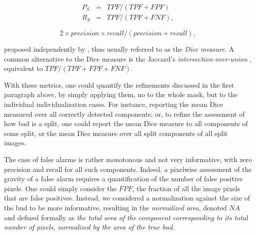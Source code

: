 \documentclass[a4paper,authoryear,review]{elsarticle}
\begin{document}
\begin{eqnarray*} 
	P_S &=& TPF / (TPF + FPF) \\
	R_S &=& TPF / (TPF + FNF),
\end{eqnarray*}

\begin{equation} 
2 \times precision \times recall / (precision + recall),
\end{equation}

proposed independently by \citet{dice1945measures}, thus usually referred to as the \emph{Dice measure}. A common alternative to the Dice measure is the  Jaccard’s \emph{intersection-over-union} \citep{jaccard1912distribution}, 
equivalent to $TPF / (TPF+FPF+FNF)$. 

With these metrics, one could quantify the refinements discussed in the first paragraph above, by simply applying them, no to the whole mask, but to the individual individualization cases. For instance, reporting the mean Dice measured over all correctly detected components; or, to refine the assessment of how bad is a split, one could report the mean Dice measure to all components of some split, or the mean Dice measure over all split components of all split images. 

The case of false alarms is rather monotonous and not very informative, with zero precision and recall for all such components. Indeed, a pixelwise assessment of the gravity of a false alarm requires a quantification of the number of false positive pixels. One could simply consider the $FPF$, the fraction of all the image pixels that are false positives. Instead, we considered a normalization against the size of the bud to be more informative, resulting in the \emph{normalized area}, denoted $NA$ and defined formally as  \emph{the total area of the component corresponding to its total number of pixels, normalized by the area of the true bud}. 

\end{document}
